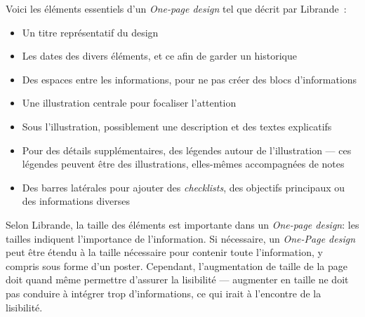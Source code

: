 







Voici les éléments essentiels d'un \emph{One-page design} tel que d\'ecrit par Librande~\cite{onepage_librande}:
\begin{itemize}
    \item Un titre représentatif du design
    \item Les dates des divers éléments, et ce afin de garder un historique
    \item Des espaces entre les informations, pour ne pas créer des blocs d'informations
    \item Une illustration centrale pour focaliser l'attention
    \item Sous l'illustration, possiblement une description et des textes explicatifs
    \item Pour des détails supplémentaires, des légendes autour de l'illustration ---
     ces légendes peuvent être des illustrations, elles-mêmes accompagnées de notes
    \item Des barres latérales pour ajouter des \emph{checklists}, des objectifs principaux ou des informations diverses
\end{itemize}

Selon Librande, la taille des éléments est importante dans un \emph{One-page design}: les tailles indiquent l'importance de l'information.
Si nécessaire, un \emph{One-Page design} peut être étendu à la taille nécessaire pour contenir toute l'information, y compris sous forme d'un poster.
Cependant, l'augmentation de taille de la page doit quand même permettre d'assurer la lisibilité --- augmenter en taille ne doit pas conduire à intégrer trop d'informations, ce qui irait à l'encontre de la lisibilité.


